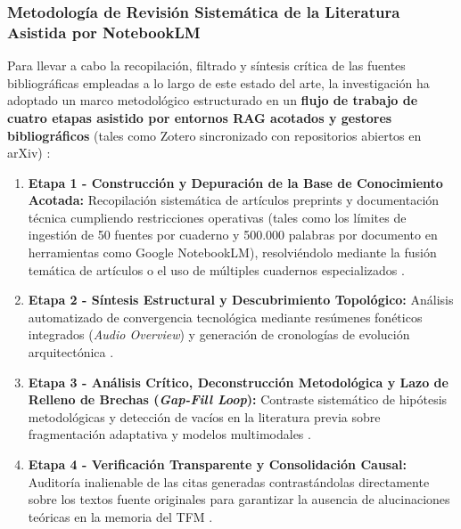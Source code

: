 \subsubsection{Metodología de Revisión Sistemática de la Literatura Asistida por NotebookLM}
\label{subsubsec:metodologia_revision_notebooklm}

Para llevar a cabo la recopilación, filtrado y síntesis crítica de las fuentes bibliográficas empleadas a lo largo de este estado del arte, la investigación ha adoptado un marco metodológico estructurado en un \textbf{flujo de trabajo de cuatro etapas asistido por entornos RAG acotados y gestores bibliográficos} (tales como Zotero sincronizado con repositorios abiertos en arXiv) \cite{easton2026notebooklm, sourclip2026notebooklm}: %

\begin{enumerate}
    \item \textbf{Etapa 1 - Construcción y Depuración de la Base de Conocimiento Acotada:} Recopilación sistemática de artículos preprints y documentación técnica cumpliendo restricciones operativas (tales como los límites de ingestión de 50 fuentes por cuaderno y 500.000 palabras por documento en herramientas como Google NotebookLM), resolviéndolo mediante la fusión temática de artículos o el uso de múltiples cuadernos especializados \cite{easton2026notebooklm}. %
    \item \textbf{Etapa 2 - Síntesis Estructural y Descubrimiento Topológico:} Análisis automatizado de convergencia tecnológica mediante resúmenes fonéticos integrados (\textit{Audio Overview}) y generación de cronologías de evolución arquitectónica \cite{easton2026notebooklm, sourclip2026notebooklm}. %
    \item \textbf{Etapa 3 - Análisis Crítico, Deconstrucción Metodológica y Lazo de Relleno de Brechas (\textit{Gap-Fill Loop}):} Contraste sistemático de hipótesis metodológicas y detección de vacíos en la literatura previa sobre fragmentación adaptativa y modelos multimodales \cite{easton2026notebooklm}. %
    \item \textbf{Etapa 4 - Verificación Transparente y Consolidación Causal:} Auditoría inalienable de las citas generadas contrastándolas directamente sobre los textos fuente originales para garantizar la ausencia de alucinaciones teóricas en la memoria del TFM \cite{easton2026notebooklm, sourclip2026notebooklm}. %
\end{enumerate}

